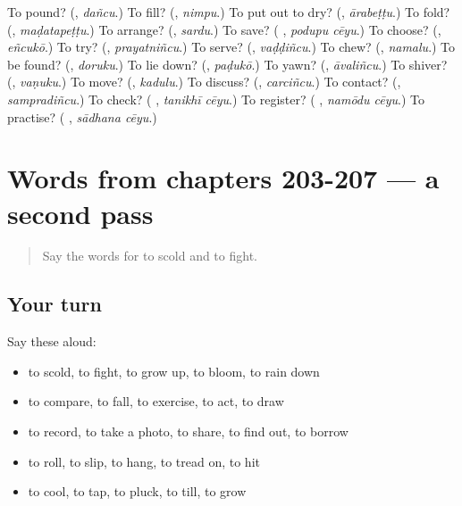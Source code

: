 \begin{tcolorbox}[breakable,colback=teal!4,colframe=teal!35!black,title={Before you move on}]
To pound? (\textbf{}, \emph{dañcu}.) To fill? (\textbf{}, \emph{nimpu}.) To put out to dry? (\textbf{}, \emph{ārabeṭṭu}.) To fold? (\textbf{}, \emph{maḍatapeṭṭu}.) To arrange? (\textbf{}, \emph{sardu}.) To save? (\textbf{ }, \emph{podupu cēyu}.) To choose? (\textbf{}, \emph{eñcukō}.) To try? (\textbf{}, \emph{prayatniñcu}.) To serve? (\textbf{}, \emph{vaḍḍiñcu}.) To chew? (\textbf{}, \emph{namalu}.) To be found? (\textbf{}, \emph{doruku}.) To lie down? (\textbf{}, \emph{paḍukō}.) To yawn? (\textbf{}, \emph{āvaliñcu}.) To shiver? (\textbf{}, \emph{vaṇuku}.) To move? (\textbf{}, \emph{kadulu}.) To discuss? (\textbf{}, \emph{carciñcu}.) To contact? (\textbf{}, \emph{sampradiñcu}.) To check? (\textbf{ }, \emph{tanikhī cēyu}.) To register? (\textbf{ }, \emph{namōdu cēyu}.) To practise? (\textbf{ }, \emph{sādhana cēyu}.)
\end{tcolorbox}
\section[(dialogue)]{Words from chapters 203-207 — a second pass}

\label{lesson:TE-R207-second-pass-words-from-chapters-203-207}



\begin{quote}
Say the words for to scold and to fight.
\end{quote}

\subsection*{Your turn}
Say these aloud:

\begin{itemize}
\raggedright
  \item to scold, to fight, to grow up, to bloom, to rain down
  \item to compare, to fall, to exercise, to act, to draw
  \item to record, to take a photo, to share, to find out, to borrow
  \item to roll, to slip, to hang, to tread on, to hit
  \item to cool, to tap, to pluck, to till, to grow
\end{itemize}

